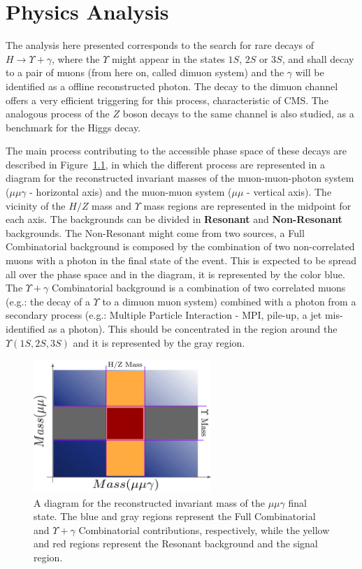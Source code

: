 \chapter{Physics Analysis}

The analysis here presented corresponds to the search for rare decays of $H \rightarrow \Upsilon + \gamma$, where the $\Upsilon$ might appear in the states $1S$, $2S$ or $3S$, and shall decay to a pair of muons (from here on, called dimuon system) and the $\gamma$ will be identified as a offline reconstructed photon. The decay to the dimuon channel offers a very efficient triggering for this process, characteristic of CMS. The analogous process of the $Z$ boson decays to the same channel is also studied, as a benchmark for the Higgs decay.

The main process contributing to the accessible phase space of these decays are described in Figure~\ref{analysis_process_diagram}, in which the different process are represented in a diagram for the reconstructed invariant masses of the muon-muon-photon system ($\mu\mu\gamma$ - horizontal axis) and the muon-muon system ($\mu\mu$ - vertical axis). The vicinity of the $H/Z$ mass and $\Upsilon$ mass regions are represented in the midpoint for each axis. The backgrounds can be divided in \textbf{Resonant} and \textbf{Non-Resonant} backgrounds. The Non-Resonant might come from two sources, a Full Combinatorial background is composed by the combination of two non-correlated muons with a photon in the final state of the event. This is expected to be spread all over the phase space and in the diagram, it is represented by the color blue. The $\Upsilon+ \gamma$ Combinatorial background is a combination of two correlated muons (e.g.: the decay of a $\Upsilon$ to a dimuon muon system) combined with a photon from a secondary process (e.g.: Multiple Particle Interaction - MPI, pile-up, a jet mis-identified as a photon). This should be concentrated in the region around the $\Upsilon(1S, 2S, 3S)$ and it is represented by the gray region.

\begin{figure}[htbp]
    \centering
    \includegraphics[width=0.6\textwidth]{figures_and_tables/analysis_process.pdf}
    \caption{A diagram for the reconstructed invariant mass of the $\mu\mu\gamma$ final state. The blue and gray regions represent the Full Combinatorial and $\Upsilon + \gamma$ Combinatorial contributions, respectively, while the yellow and red regions represent the Resonant background and the signal region.}
    \label{analysis_process_diagram}
\end{figure}

